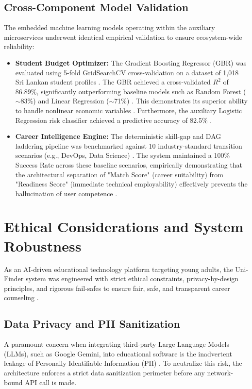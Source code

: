 \documentclass[conference]{IEEEtran}
\begin{document}
\subsection{Cross-Component Model Validation}

The embedded machine learning models operating within the auxiliary microservices underwent identical empirical validation to ensure ecosystem-wide reliability:
\begin{itemize}
    \item \textbf{Student Budget Optimizer:} The Gradient Boosting Regressor (GBR) was evaluated using 5-fold GridSearchCV cross-validation on a dataset of 1,018 Sri Lankan student profiles \cite{li2024dynamic}. The GBR achieved a cross-validated $R^2$ of 86.89\%, significantly outperforming baseline models such as Random Forest ($\sim$83\%) and Linear Regression ($\sim$71\%) \cite{li2024dynamic}. This demonstrates its superior ability to handle nonlinear economic variables \cite{li2024dynamic}. Furthermore, the auxiliary Logistic Regression risk classifier achieved a predictive accuracy of 82.5\% \cite{li2024dynamic}.
    \item \textbf{Career Intelligence Engine:} The deterministic skill-gap and DAG laddering pipeline was benchmarked against 10 industry-standard transition scenarios (e.g., DevOps, Data Science) \cite{kardan2024conceptualisation}. The system maintained a 100\% Success Rate across these baseline scenarios, empirically demonstrating that the architectural separation of "Match Score" (career suitability) from "Readiness Score" (immediate technical employability) effectively prevents the hallucination of user competence \cite{kardan2024conceptualisation}.
\end{itemize}



\section{Ethical Considerations and System Robustness}

As an AI-driven educational technology platform targeting young adults, the Uni-Finder system was engineered with strict ethical constraints, privacy-by-design principles, and rigorous fail-safes to ensure fair, safe, and transparent career counseling \cite{silva2026systematic, springer2024genai_sl}.

\subsection{Data Privacy and PII Sanitization}
A paramount concern when integrating third-party Large Language Models (LLMs), such as Google Gemini, into educational software is the inadvertent leakage of Personally Identifiable Information (PII) \cite{springer2024genai_sl}. To neutralize this risk, the architecture enforces a strict data sanitization perimeter before any network-bound API call is made.
\end{document}
